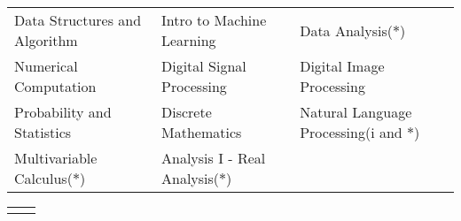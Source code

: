 

{\fontsize{10pt}{1.5em}\bodyfontlight\upshape\color{text}
  \setlength\extrarowheight{-3pt}
  \begin{tabular*}{\textwidth}{L{\textwidth/3} L{\textwidth/3} L{\textwidth/3}}
	  Data Structures and Algorithm & Intro to Machine Learning & Data Analysis($*$) \\
	  Numerical Computation & Digital Signal Processing & Digital Image Processing \\
	  Probability and Statistics & Discrete Mathematics & Natural Language Processing(i and $*$) \\
	  Multivariable Calculus($*$) & Analysis I - Real Analysis($*$) \\

\end{tabular*}

\fontsize{10pt}{1em}\footerfont\upshape\color{text}
\begin{tabular*}{\textwidth}{L{\textwidth/3 + 1cm} L{\textwidth/3}}
   & 
\end{tabular*}
\vspace{-1em}
}
